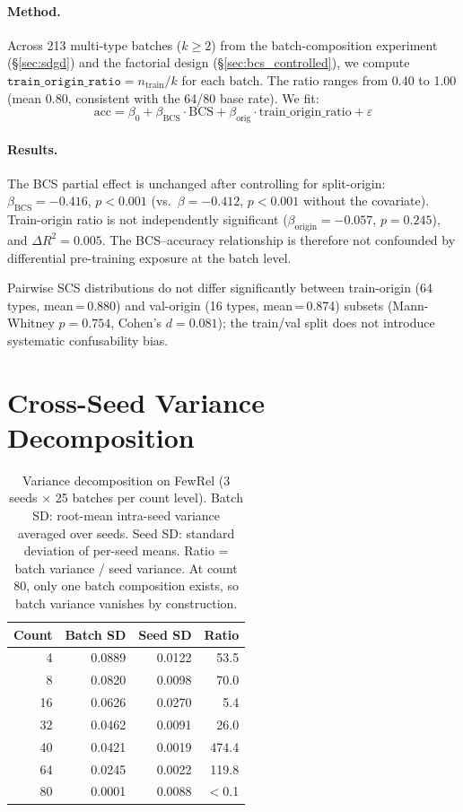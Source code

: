 \documentclass[11pt]{article}
\begin{document}
\paragraph{Method.}  Across 213 multi-type batches ($k \geq 2$) from the batch-composition experiment (\S\ref{sec:sdgd}) and the factorial design (\S\ref{sec:bcs_controlled}), we compute $\texttt{train\_origin\_ratio} = n_{\text{train}} / k$ for each batch.  The ratio ranges from 0.40 to 1.00 (mean 0.80, consistent with the 64/80 base rate).  We fit:
{\small\begin{equation*}
\text{acc} = \beta_0 + \beta_{\text{BCS}} \!\cdot\! \text{BCS} + \beta_{\text{orig}} \!\cdot\! \text{train\_origin\_ratio} + \varepsilon
\end{equation*}}

\paragraph{Results.}  The BCS partial effect is unchanged after controlling for split-origin: $\beta_{\text{BCS}} = -0.416$, $p < 0.001$ (vs.\ $\beta = -0.412$, $p < 0.001$ without the covariate).  Train-origin ratio is not independently significant ($\beta_{\text{origin}} = -0.057$, $p = 0.245$), and $\Delta R^2 = 0.005$.  The BCS--accuracy relationship is therefore not confounded by differential pre-training exposure at the batch level.

Pairwise SCS distributions do not differ significantly between train-origin (64 types, mean\,=\,0.880) and val-origin (16 types, mean\,=\,0.874) subsets (Mann-Whitney $p = 0.754$, Cohen's $d = 0.081$); the train/val split does not introduce systematic confusability bias.

\section{Cross-Seed Variance Decomposition}
\label{app:variance-decomposition}

\begin{table}[h]
\centering
\small
\caption{Variance decomposition on FewRel (3 seeds $\times$ 25 batches per count level). Batch SD: root-mean intra-seed variance averaged over seeds. Seed SD: standard deviation of per-seed means. Ratio = batch variance / seed variance. At count 80, only one batch composition exists, so batch variance vanishes by construction.}
\label{tab:variance_decomposition}
\begin{tabular}{rrrr}
\toprule
\textbf{Count} & \textbf{Batch SD} & \textbf{Seed SD} & \textbf{Ratio} \\
\midrule
4 & 0.0889 & 0.0122 & 53.5 \\
8 & 0.0820 & 0.0098 & 70.0 \\
16 & 0.0626 & 0.0270 & 5.4 \\
32 & 0.0462 & 0.0091 & 26.0 \\
40 & 0.0421 & 0.0019 & 474.4 \\
64 & 0.0245 & 0.0022 & 119.8 \\
80 & 0.0001 & 0.0088 & $<$0.1 \\
\bottomrule
\end{tabular}
\end{table}
\end{document}
